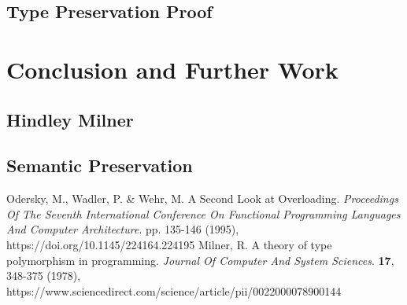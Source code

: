 \documentclass[runningheads]{llncs}
\begin{document}
\subsection{Type Preservation Proof}
\section{Conclusion and Further Work}
\subsection{Hindley Milner}
\subsection{Semantic Preservation}

\begin{thebibliography}{8}

Odersky, M., Wadler, P. \& Wehr, M. A Second Look at Overloading. 
{\em Proceedings Of The Seventh International Conference On Functional Programming Languages And Computer Architecture}. 
pp. 135-146 (1995), https://doi.org/10.1145/224164.224195
Milner, R. A theory of type polymorphism in programming. 
{\em Journal Of Computer And System Sciences}. 
\textbf{17}, 348-375 (1978), https://www.sciencedirect.com/science/article/pii/0022000078900144

\end{thebibliography}
\end{document}
